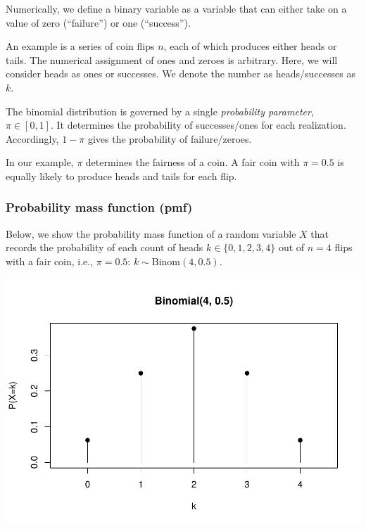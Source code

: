 \documentclass[
  11pt,
]{article}
\begin{document}
Numerically, we define a binary variable as a variable that can either take on a value of zero (``failure'') or one (``success'').

An example is a series of coin flips \(n\), each of which produces either heads or tails. The numerical assignment of ones and zeroes is arbitrary. Here, we will consider heads as ones or successes. We denote the number as heads/successes as \(k\).

The binomial distribution is governed by a single \emph{probability parameter}, \(\pi \in [0,1]\). It determines the probability of successes/ones for each realization. Accordingly, \(1 - \pi\) gives the probability of failure/zeroes.

In our example, \(\pi\) determines the fairness of a coin. A fair coin with \(\pi = 0.5\) is equally likely to produce heads and tails for each flip.

\hypertarget{probability-mass-function-pmf}{%
\subsubsection{Probability mass function (pmf)}\label{probability-mass-function-pmf}}

Below, we show the probability mass function of a random variable \(X\) that records the probability of each count of heads \(k \in \{0, 1, 2, 3, 4\}\) out of \(n=4\) flips with a fair coin, i.e., \(\pi = 0.5\): \(k \sim \text{Binom}(4, 0.5)\).

\begin{center}\includegraphics{01-01-lec_files/figure-latex/binom-1-1} \end{center}
\end{document}
